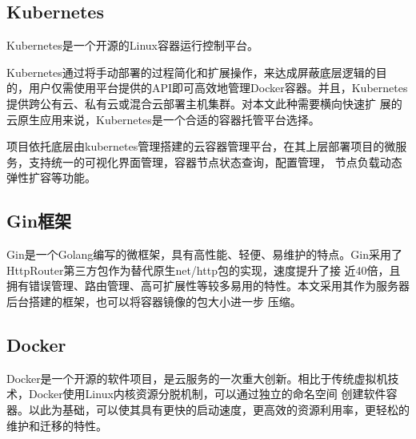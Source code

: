 \subsection{Kubernetes}
Kubernetes是一个开源的Linux容器运行控制平台。

Kubernetes通过将手动部署的过程简化和扩展操作，来达成屏蔽底层逻辑的目
的，用户仅需使用平台提供的API即可高效地管理Docker容器。并且，Kubernetes提供跨公有云、私有云或混合云部署主机集群。对本文此种需要横向快速扩
展的云原生应用来说，Kubernetes是一个合适的容器托管平台选择\cite{zhong2021machine}。

项目依托底层由kubernetes管理搭建的云容器管理平台，在其上层部署项目的微服务，支持统一的可视化界面管理，容器节点状态查询，配置管理，
节点负载动态弹性扩容等功能\cite{Tuli_2022}。

%

\subsection{Gin框架}
Gin是一个Golang编写的微框架，具有高性能、轻便、易维护的特点。Gin采用了HttpRouter第三方包作为替代原生net/http包的实现，速度提升了接
近40倍，且拥有错误管理、路由管理、高可扩展性等较多易用的特性。本文采用其作为服务器后台搭建的框架，也可以将容器镜像的包大小进一步
压缩。

\subsection{Docker}
Docker是一个开源的软件项目，是云服务的一次重大创新。相比于传统虚拟机技术，Docker使用Linux内核资源分脱机制，可以通过独立的命名空间
创建软件容器。以此为基础，可以使其具有更快的启动速度，更高效的资源利用率，更轻松的维护和迁移的特性。


%
%
%



